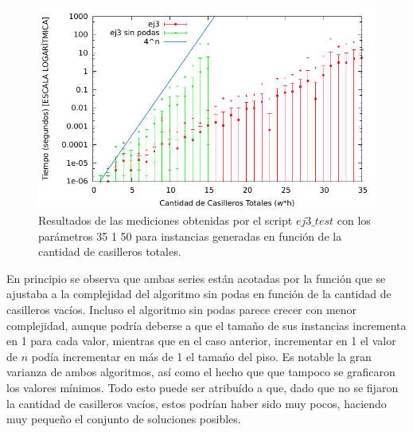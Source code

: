 \begin{figure}[H]
\centering
\def\svgwidth{140 pt}
\includegraphics{../codigo/ej3/tests/ej3b.pdf}
\caption{Resultados de las mediciones obtenidas por el script $ej3\_test$ con los par\'ametros 35 1 50 para instancias generadas en funci\'on de la cantidad de casilleros totales.}
\end{figure}
\par{En principio se observa que ambas series est\'an acotadas por la funci\'on que se ajustaba a la complejidad del algoritmo sin podas en funci\'on de la cantidad de casilleros vac\'ios. Incluso el algoritmo sin podas parece crecer con menor complejidad, aunque podr\'ia deberse a que el tama\~no de sus instancias incrementa en 1 para cada valor, mientras que en el caso anterior, incrementar en 1 el valor de $n$ pod\'ia incrementar en m\'as de 1 el tama\'no del piso. Es notable la gran varianza de ambos algoritmos, as\'i como el hecho que que tampoco se graficaron los valores m\'inimos. Todo esto puede ser atribu\'ido a que, dado que no se fijaron la cantidad de casilleros vac\'ios, estos podr\'ian haber sido muy pocos, haciendo muy peque\~no el conjunto de soluciones posibles.}
